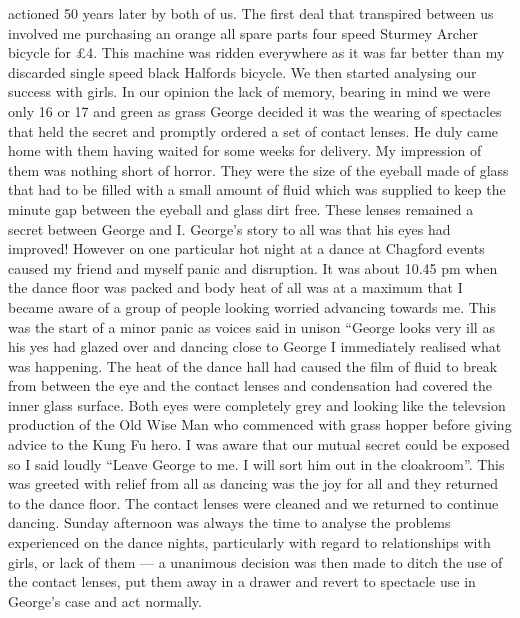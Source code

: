 actioned 50 years later by both of us. The first deal that transpired between
us involved me purchasing an orange all spare parts four speed Sturmey Archer
bicycle for £4. This machine was ridden everywhere as it was far better than my
discarded single speed black Halfords bicycle. We then started analysing our
success with girls. In our opinion the lack of memory, bearing in mind we were
only 16 or 17 and green as grass George decided it was the wearing of
spectacles that held the secret and promptly ordered a set of contact lenses.
He duly came home with them having waited for some weeks for delivery. My
impression of them was nothing short of horror. They were the size of the
eyeball made of glass that had to be filled with a small amount of fluid which
was supplied to keep the minute gap between the eyeball and glass dirt free.
These lenses remained a secret between George and I. George's story to all was
that his eyes had improved! However on one particular hot night at a dance at
Chagford events caused my friend and myself panic and disruption. It was about
10.45 pm when the dance floor was packed and body heat of all was at a maximum
that I became aware of a group of people looking worried advancing towards me.
This was the start of a minor panic as voices said in unison ``George looks
very ill as his yes had glazed over and dancing close to George I immediately
realised what was happening. The heat of the dance hall had caused the film of
fluid to break from between the eye and the contact lenses and condensation had
covered the inner glass surface. Both eyes were completely grey and looking
like the televsion production of the Old Wise Man who commenced with grass
hopper before giving advice to the Kung Fu hero. I was aware that our mutual
secret could be exposed so I said loudly ``Leave George to me. I will sort him
out in the cloakroom''. This was greeted with relief from all as dancing was
the joy for all and they returned to the dance floor. The contact lenses were
cleaned and we returned to continue dancing. Sunday afternoon was always the
time to analyse the problems experienced on the dance nights, particularly with
regard to relationships with girls, or lack of them --- a unanimous decision
was then made to ditch the use of the contact lenses, put them away in a drawer
and revert to spectacle use in George's case and act normally.

